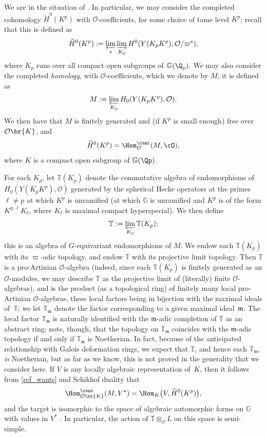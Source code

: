 We are in the situation of \cite[(3.2)]{em0}.
In particular, we may consider the completed cohomology
$\widetilde{H}^0(K^p)$ with $\mathcal O$-coefficients,
for some choice of tame level $K^p$;
recall that this is defined as
\[
\widetilde{H}^0(K^p) := \varprojlim_s \varinjlim_{K_p}
H^0( Y(K_pK^p) , \mathcal O/ \varpi^s),
\]
where $K_p$ runs over all compact open subgroups of $\mathbb G(\Q_p)$.
We may also consider the completed {\em homology}, with $\mathcal O$-coefficients,
which we denote by $M$;
it is defined as
\[
M := \varprojlim_{K_p}
H_0(Y(K_pK^p) ,\mathcal O).
\]
We then have
that $M$ is finitely generated and (if $K^p$ is small enough)
free over~$\mathcal O\br{K}$, and
\begin{equation}\label{ref_wants}
\widetilde{H}^0(K^p) = \Hom^{\cont}_{\mathcal O}(M,\cO),
\end{equation}
where $K$ is a compact open subgroup of $\mathbb G(\Qp)$.

For each $K_p$, let $\mathbb T(K_p)$ denote the commutative algebra
of endomorphisms of
$H_0
(Y(K_pK^p) ,
\mathcal O)$
generated by the spherical Hecke operators
at the primes $\ell \neq p$ at which $K^p$ is unramified (\ie at which
$\mathbb G$ is unramified and $K^p$ is of the form
$K^{p,\ell} K_{\ell}$, where $K_{\ell}$ is maximal compact hyperspecial).
We then define
\[
\mathbb T := \varprojlim_{K_p} \mathbb T(K_p);
\]
this is an algebra of $G$-equivariant endomorphisms of $M$.
We endow each $\mathbb T(K_p)$ with its $\varpi$-adic topology,
and endow $\mathbb T$ with its projective limit topology.
Then $\mathbb T$ is a pro-Artinian $\mathcal O$-algebra
(indeed, since each $\mathbb T(K_p)$ is finitely generated as an $\mathcal O$-modules,
we may describe $\mathbb T$ as
the projective limit of (literally) finite $\mathcal O$-algebras),
and is the product (as a topological ring) of finitely many local pro-Artinian
$\mathcal O$-algebras,
these local factors being in bijection with the maximal ideals of~$\mathbb T$;
we let $\mathbb T_{\mathfrak m}$ denote the factor corresponding to a given
maximal ideal~$\mathfrak m$.
The local factor $\mathbb T_{\mathfrak m}$ is naturally identified with
the $\mathfrak m$-adic completion of $\mathbb T$ as an abstract ring;
note, though, that the topology on $\mathbb T_{\mathfrak m}$ coincides with the
$\mathfrak m$-adic topology if and only if $\mathbb T_{\mathfrak m}$
is Noetherian. In fact, because of the anticipated relationship
with Galois deformation rings, we expect that $\mathbb T$,
and hence each $\mathbb T_{\mathfrak m}$, {\em is} Noetherian,
but as far as we know, this is not proved in the generality that we consider here.
If $V$ is any locally algebraic representation of~$K$,
then it follows from \eqref{ref_wants} and Schikhof duality \cite[Th.\,3.5]{iw} that
\[
\Hom_{\mathcal O\br{K}}^{\cont}(M,V^*) =
\Hom_{ K} \bigl(V, \widetilde{H}^0(K^p)\bigr),
\]
and the target is isomorphic to the space of algebraic automorphic forms
on $\mathbb G$ with values in $V^*$ \cite[Prop.\,3.2.4]{em0}.
In particular, the action of $\mathbb T \otimes_{\mathcal O}L$ on
this space is semi-simple.

